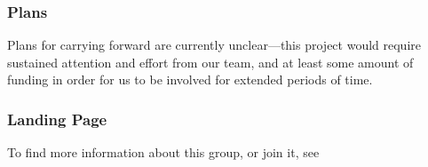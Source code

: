 \subsubsection{Plans}

Plans for carrying forward are currently unclear---this project would require
sustained attention and effort from our team, and at least some amount of
funding in order for us to be involved for extended periods of time.

\subsubsection{Landing Page}

To find more information about this group, or join it, see 
